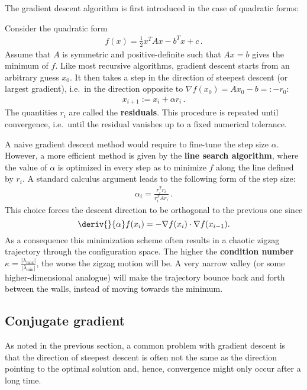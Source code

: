     The gradient descent algorithm is first introduced in the case of quadratic forms:
    \begin{method}
        Consider the quadratic form
        \begin{gather}
            f(x) = \frac{1}{2}x^TAx - b^Tx + c\,.
        \end{gather}
        Assume that $A$ is symmetric and positive-definite such that $Ax=b$ gives the minimum of $f$. Like most recursive algorithms, gradient descent starts from an arbitrary guess $x_0$. It then takes a step in the direction of steepest descent (or largest gradient), i.e.~in the direction opposite to $\nabla f(x_0) = Ax_0-b =: -r_0$:
        \begin{gather}
            x_{i+1} := x_i + \alpha r_i\,.
        \end{gather}
        The quantities $r_i$ are called the \textbf{residuals}. This procedure is repeated until convergence, i.e.~until the residual vanishes up to a fixed numerical tolerance.

        A naive gradient descent method would require to fine-tune the step size $\alpha$. However, a more efficient method is given by the \textbf{line search algorithm}, where the value of $\alpha$ is optimized in every step as to minimize $f$ along the line defined by $r_i$. A standard calculus argument leads to the following form of the step size:
        \begin{gather}
            \alpha_i = \frac{r_i^Tr_i}{r_i^TAr_i}\,.
        \end{gather}
        This choice forces the descent direction to be orthogonal to the previous one since \[\deriv{}{\alpha}f(x_i) = -\nabla f(x_i)\cdot\nabla f(x_{i-1}).\] As a consequence this minimization scheme often results in a chaotic zigzag trajectory through the configuration space. The higher the \textbf{condition number} $\kappa=\frac{|\lambda_{\max}|}{|\lambda_{\min}|}$, the worse the zigzag motion will be. A very narrow valley (or some higher-dimensional analogue) will make the trajectory bounce back and forth between the walls, instead of moving towards the minimum.
    \end{method}

\subsection{Conjugate gradient}

    As noted in the previous section, a common problem with gradient descent is that the direction of steepest descent is often not the same as the direction pointing to the optimal solution and, hence, convergence might only occur after a long time.

